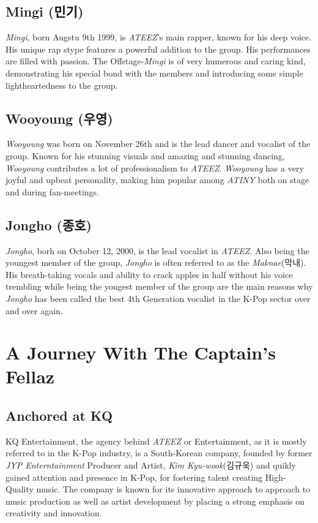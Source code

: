 \documentclass[a4paper,12pt]{article}
\begin{document}
\subsection{Mingi (민기)}\label{sec:membermingi}
\textit{Mingi}, born Augstu 9th 1999, is \textit{ATEEZ}'s main rapper, known for his deep voice. His unique rap stype features a powerful addition to the group. His performances are filled with passion. The Offstage-\textit{Mingi} is of very humerous and caring kind, demonstrating his special bond with the members and introducing some simple lightheartedness to the group.
\subsection{Wooyoung (우영)}\label{sec:memberwooyoung}
\textit{Wooyoung} was born on November 26th and  is the lead dancer and vocalist of the group. Known for his stunning visuals and amazing and stunning dancing, \textit{Wooyoung} contributes a lot of professionalism to \textit{ATEEZ}. \textit{Wooyoung} has a very joyful and upbeat personality, making him popular among \textit{ATINY} both on stage and during fan-meetings.
\subsection{Jongho (종호)}\label{sec:memberjongho}
\textit{Jongho}, borh on October 12, 2000, is the lead vocalist in \textit{ATEEZ}. Also being the youngest member of the group, \textit{Jongho} is often referred to as the \textit{Maknae}(막내). His breath-taking vocals and ability to crack apples in half without his voice trembling while being the yougest member of the group are the main reasons why \textit{Jongho} has been called the best 4th Generation vocalist in the K-Pop sector over and over again.

\section{A Journey With The Captain's Fellaz}\label{sec:history}
\subsection{Anchored at KQ}
KQ Entertainment, the agency behind \textit{ATEEZ} or Entertainment, as it is mostly referred to in the K-Pop industry, is a South-Korean company, founded by former \textit{JYP Enterntainment} Producer and Artist, \textit{Kim Kyu-wook}(김규욱) and quikly gained attention and presence in K-Pop, for fostering talent creating High-Quality music. The company is known for its innovative approach to approach to music production as well as artist development by placing a strong emphasis on creativity and innovation.
\end{document}
